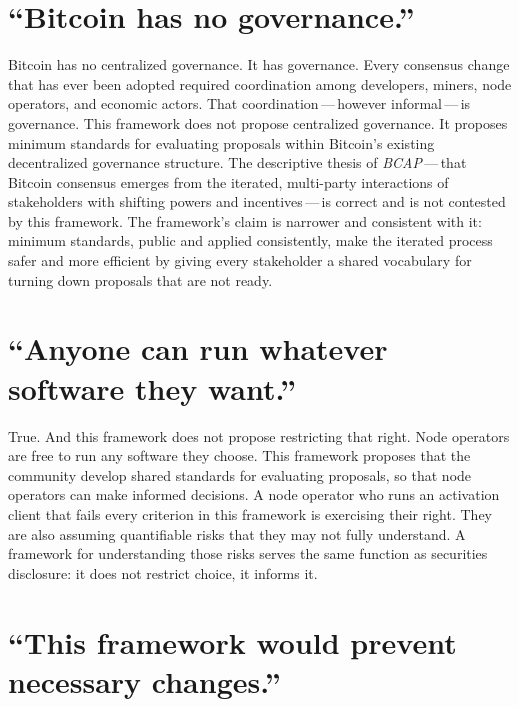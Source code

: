 \documentclass[11pt, twoside, openright]{book}
\begin{document}
\section{\texorpdfstring{``Bitcoin has no governance.''}{\textquotedblleft Bitcoin has no governance.\textquotedblright}}

Bitcoin has no centralized governance. It has governance. Every consensus change that has ever been adopted required coordination among developers, miners, node operators, and economic actors. That coordination\,---\,however informal\,---\,is governance. This framework does not propose centralized governance. It proposes minimum standards for evaluating proposals within Bitcoin's existing decentralized governance structure. The descriptive thesis of \textit{BCAP}\,---\,that Bitcoin consensus emerges from the iterated, multi-party interactions of stakeholders with shifting powers and incentives\,---\,is correct and is not contested by this framework. The framework's claim is narrower and consistent with it: minimum standards, public and applied consistently, make the iterated process safer and more efficient by giving every stakeholder a shared vocabulary for turning down proposals that are not ready.

\section{\texorpdfstring{``Anyone can run whatever software they want.''}{\textquotedblleft Anyone can run whatever software they want.\textquotedblright}}

True. And this framework does not propose restricting that right. Node operators are free to run any software they choose. This framework proposes that the community develop shared standards for evaluating proposals, so that node operators can make informed decisions. A node operator who runs an activation client that fails every criterion in this framework is exercising their right. They are also assuming quantifiable risks that they may not fully understand. A framework for understanding those risks serves the same function as securities disclosure: it does not restrict choice, it informs it.

\section{\texorpdfstring{``This framework would prevent necessary changes.''}{\textquotedblleft This framework would prevent necessary changes.\textquotedblright}}
\end{document}
